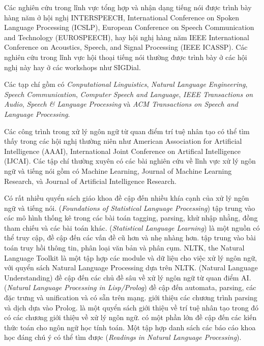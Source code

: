 Các nghiên cứu trong lĩnh vực tổng hợp và nhận dạng tiếng nói được trình bày hàng năm ở hội nghị INTERSPEECH, International Conference on Spoken Language Processing (ICSLP), European Conference on Speech Communication and Technology (EUROSPEECH), hay hội nghị hàng năm IEEE International Conference on Acoustics, Speech, and Signal Processing (IEEE ICASSP). Các nghiên cứu trong lĩnh vực hội thoại tiếng nói thường được trình bày ở các hội nghị này hay ở các workshops như SIGDial.

Các tạp chí gồm có \textit{Conputational Linguistics}, \textit{Natural Language Engineering}, \textit{Speech Communication}, \textit{Computer Speech and Language}, \textit{IEEE Transactions on Audio}, \textit{Speech & Language Processing} và \textit{ACM Transactions on Speech and Language Processing}.

Các công trình trong xử lý ngôn ngữ từ quan điểm trí tuệ nhân tạo có thể tìm thấy trong các hội nghị thường niên như American Association for Artificial Intelligence (AAAI), International Joint Conference on Artifical Intelligence (IJCAI). Các tập chí thường xuyên có các bài nghiên cứu về lĩnh vực xử lý ngôn ngữ và tiếng nói gồm có Machine Learning, Journal of Machine Learning Research, và Journal of Artificial Intelligence Research.

Có rất nhiều quyển sách giáo khoa đề cập đến nhiều khía cạnh của xử lý ngôn ngữ và tiếng nói. \citet{manning1999foundations} (\textit{Foundations of Statistical Language Processing}) tập trung vào các mô hình thống kê trong các bài toán tagging, parsing, khử nhập nhằng, đồng tham chiếu và các bài toán khác. \citet{charniak1996statistical} (\textit{Statistical Language Learning}) là một nguồn có thể truy cập, đề cập đến các vấn đề cũ hơn và nhẹ nhàng hơn. \citet{manning3h} tập trung vào bài toán truy hồi thông tin, phân loại văn bản và phân cụm. NLTK, the Natural Language Toolkit \citet{bird2004nltk} là một tập hợp các module và dữ liệu cho việc xử lý ngôn ngữ, với quyển sách Natural Language Processing dựa trên NLTK. \citet{allen1995natural} (Natural Language Understanding) đề cập đến các chủ đề sâu về xử lý ngôn ngữ từ quan điểm AI. \citet{gazdar1989natural} (\textit{Natural Language Processing in Lisp/Prolog}) đề cập đến automata, parsing, các đặc trưng và unification và có sẵn trên mạng. \citet{Pereira:1987:PNL:576399} giới thiệu các chương trình parsing và dịch dựa vào Prolog. \citet{russell2002artificial} là một quyển sách giới thiệu về trí tuệ nhân tạo trong đó có các chương giới thiệu về xử lý ngôn ngữ. \citet{partee1990domains} có một phần lớn đề cập đến các kiến thức toán cho ngôn ngữ học tính toán. Một tập hợp danh sách các báo cáo khoa học đáng chú ý có thể tìm được \citet{grosz1986readings} (\textit{Readings in Natural Language Processing}).
